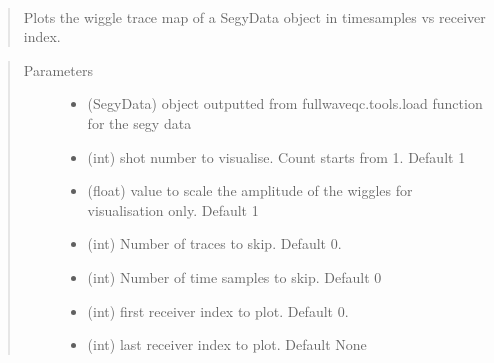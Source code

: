 \documentclass[letterpaper,10pt,english]{sphinxmanual}
\begin{document}

\begin{fulllineitems}
\label{\detokenize{index:fullwaveqc.visual.wiggle}}~\begin{quote}

Plots the wiggle trace map of a SegyData object in timesamples vs receiver index.
\end{quote}
\begin{quote}\begin{description}
\item[{Parameters}] \leavevmode\begin{itemize}
\item {} 
 \textendash{} (SegyData)   object outputted from fullwaveqc.tools.load function for the segy data

\item {} 
 \textendash{} (int)        shot number to visualise. Count starts from 1. Default 1

\item {} 
 \textendash{} (float)      value to scale the amplitude of the wiggles for visualisation only. Default 1

\item {} 
 \textendash{} (int)        Number of traces to skip. Default 0.

\item {} 
 \textendash{} (int)        Number of time samples to skip. Default 0

\item {} 
 \textendash{} (int)        first receiver index to plot. Default 0.

\item {} 
 \textendash{} (int)        last receiver index to plot. Default None


\end{itemize}
\end{description}
\end{quote}
\end{fulllineitems}
\end{document}
